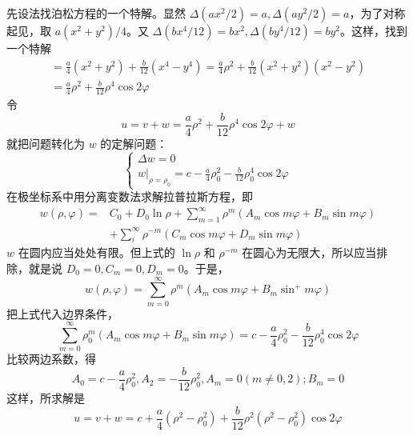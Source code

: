 \begin{example}{}
先设法找泊松方程的一个特解。显然 $\Delta (ax^2/2)=a, \Delta (ay^2/2)=a$，为了对称起见，取 $a(x^2+y^2)/4$。又 $\Delta (bx^4/12)=bx^2,\Delta (by^4/12)=by^2$。这样，找到一个特解
\begin{equation}
    \begin{array}{l}=\frac{a}{4}\left(x^{2}+y^{2}\right)+\frac{b}{12}\left(x^{4}-y^{4}\right)=\frac{a}{4} \rho^{2}+\frac{b}{12}\left(x^{2}+y^{2}\right)\left(x^{2}-y^{2}\right) \\ =\frac{a}{4} \rho^{2}+\frac{b}{12} \rho^{4} \cos 2 \varphi\end{array}
\end{equation}
令
\begin{equation}
    u=v+w=\frac{a}{4} \rho^{2}+\frac{b}{12} \rho^{4} \cos 2 \varphi+w
\end{equation}
就把问题转化为 $w$ 的定解问题：
\begin{equation}
    \left\{\begin{array}{l}\Delta w=0 \\ \left.w\right|_{\rho=\rho_{0}}=c-\frac{a}{4} \rho_{0}^{2}-\frac{b}{12} \rho_{0}^{4} \cos 2 \varphi\end{array}\right.
\end{equation}
在极坐标系中用分离变数法求解拉普拉斯方程，即
\begin{equation}
    \begin{aligned} w(\rho, \varphi)=& C_{0}+D_{0} \ln \rho+\sum_{m=1}^{\infty} \rho^{m}\left(A_{m} \cos m \varphi+B_{m} \sin m \varphi\right) \\ &+\sum_{i}^{\infty} \rho^{-m}\left(C_{m} \cos m \varphi+D_{m} \sin m \varphi\right) \end{aligned}
\end{equation}
$w $ 在圆内应当处处有限。但上式的 $\ln \rho $ 和 $\rho^{-m}$ 在圆心为无限大，所以应当排除，就是说 $D_0=0,C_m=0,D_m=0$。于是，
\begin{equation}
    w(\rho, \varphi)=\sum_{m=0}^{\infty} \rho^{m}\left(A_{m} \cos m \varphi+B_{m} \sin ^{+} m \varphi\right)
\end{equation}
把上式代入边界条件，
\begin{equation}
    \sum_{m=0}^{\infty} \rho_{0}^{m}\left(A_{m} \cos m \varphi+B_{m} \sin m \varphi\right)=c-\frac{a}{4} \rho_{0}^{2}-\frac{b}{12} \rho_{0}^{4} \cos 2 \varphi
\end{equation}
比较两边系数，得
\begin{equation}
    A_{0}=c-\frac{a}{4} \rho_{0}^{2}, A_{2}=-\frac{b}{12} \rho_{0}^{2}, A_{m}=0(m \neq 0,2) ; B_{m}=0
\end{equation}
这样，所求解是
\begin{equation}
    u=v+w=c+\frac{a}{4}\left(\rho^{2}-\rho_{0}^{2}\right)+\frac{b}{12} \rho^{2}\left(\rho^{2}-\rho_{0}^{2}\right) \cos 2 \varphi
\end{equation}
\end{example}


